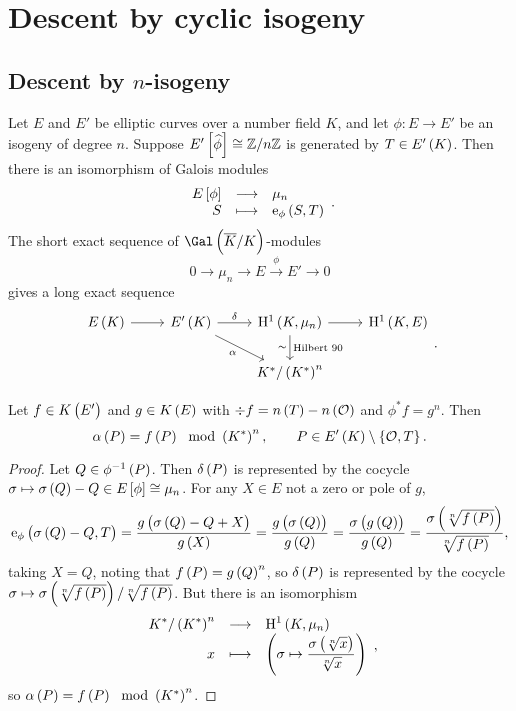 \pagebreak

\section{Descent by cyclic isogeny}

\subsection{Descent by \texorpdfstring{$ n $}{n}-isogeny}

Let $ E $ and $ E' $ be elliptic curves over a number field $ K $, and let $ \phi : E \to E' $ be an isogeny of degree $ n $. Suppose $ E'\sbr{\widehat{\phi}} \cong \ZZ / n\ZZ $ is generated by $ T \in E'\br{K} $. Then there is an isomorphism of Galois modules
$$ \function{E\sbr{\phi}}{\mu_n}{S}{\e_\phi\br{S, T}}. $$
The short exact sequence of $ \Gal\br{\overline{K} / K} $-modules
$$ 0 \to \mu_n \to E \xrightarrow{\phi} E' \to 0 $$
gives a long exact sequence
$$
\begin{tikzcd}
E\br{K} \arrow{r} & E'\br{K} \arrow{r}{\delta} \arrow{dr}[swap]{\alpha} & \H^1\br{K, \mu_n} \arrow{r} \arrow{d}{\text{Hilbert 90}}[swap]{\sim} & \H^1\br{K, E} \\
& & K^* / \br{K^*}^n &
\end{tikzcd}.
$$

\begin{theorem}
\label{thm:16.1}
Let $ f \in K\br{E'} $ and $ g \in K\br{E} $ with $ \div f = n\br{T} - n\br{\OOO} $ and $ \phi^*f = g^n $. Then
$$ \alpha\br{P} = f\br{P} \mod \br{K^*}^n, \qquad P \in E'\br{K} \setminus \cbr{\OOO, T}. $$
\end{theorem}

\begin{proof}
Let $ Q \in \phi^{-1}\br{P} $. Then $ \delta\br{P} $ is represented by the cocycle $ \sigma \mapsto \sigma\br{Q} - Q \in E\sbr{\phi} \cong \mu_n $. For any $ X \in E $ not a zero or pole of $ g $,
$$ \e_\phi\br{\sigma\br{Q} - Q, T} = \dfrac{g\br{\sigma\br{Q} - Q + X}}{g\br{X}} = \dfrac{g\br{\sigma\br{Q}}}{g\br{Q}} = \dfrac{\sigma\br{g\br{Q}}}{g\br{Q}} = \dfrac{\sigma\br{\sqrt[n]{f\br{P}}}}{\sqrt[n]{f\br{P}}}, $$
taking $ X = Q $, noting that $ f\br{P} = g\br{Q}^n $, so $ \delta\br{P} $ is represented by the cocycle $ \sigma \mapsto \sigma\br{\sqrt[n]{f\br{P}}} / \sqrt[n]{f\br{P}} $. But there is an isomorphism
$$ \function{K^* / \br{K^*}^n}{\H^1\br{K, \mu_n}}{x}{\br{\sigma \mapsto \dfrac{\sigma\br{\sqrt[n]{x}}}{\sqrt[n]{x}}}}, $$
so $ \alpha\br{P} = f\br{P} \mod \br{K^*}^n $.
\end{proof}

